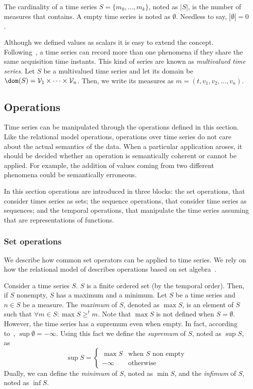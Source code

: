 The cardinality of a time series $S=\{m_0,\dots,m_k\}$, noted as
$|S|$, is the number of measures that contains.  A empty time series is
noted as $\emptyset$. Needless to say, $|\emptyset|=0$.

Although we defined values as scalars it is easy to extend the
concept. Following~\cite{assfalg08:thesis}, a time series can record
more than one phenomena if they share the same acquisition time
instants.  This kind of series are known as \emph{multivalued time
  series}. Let $S$ be a multivalued time series and let its domain be
$\dom(S)={\cal{V}}_1\times\cdots\times{\cal{V}}_n$. Then, we write its
measures as $m=(t,v_1,v_2,\ldots,v_n)$.





\subsection{Operations}
\label{sec:model:operations}

Time series can be manipulated through the operations defined in this
section.
%
Like the relational model operations, operations over time series do
not care about the actual semantics of the data. When a particular
application aroses, it should be decided whether an operation is
semantically coherent or cannot be applied. For example, the addition
of values coming from two different phenomena could be semantically
erroneous.

In this section operations are introduced in three blocks: the set
operations, that consider times series as sets; the sequence
operations, that consider time series as sequences; and the temporal
operations, that manipulate the time series assuming that are
representations of functions. 



\subsubsection{Set operations}

We describe how common set operators can be applied to time series. We
rely on how the relational model of  describes operations
based on set algebra~\cite{date:introduction}.

Consider a time series $S$. $S$ is a finite ordered set (by the
temporal order). Then, if $S$ nonempty, $S$ has a maximum and a
minimum.  
%
Let $S$ be a time series and $n\in S$ be a measure. The \emph{maximum}
of $S$, denoted as $\max S$, is an element of $S$ such that $\forall m
\in S:\max S\geq^t m $.  
%
Note that $\max S$ is not defined when $S=\emptyset$. However, the
time series has a supremum even when empty. In fact, according
to~\cite{cantrell:extendedreal}, $\sup \emptyset=-\infty$.
%
Using this fact we define the \emph{supremum} of $S$, noted as
$\sup S$, as
\[
\sup S =\begin{cases}
  \max S    & \text{when $S$ non empty}\\
  -\infty   & \text{otherwise}
\end{cases}
\]
Dually, we can define the \emph{minimum} of $S$, noted as $\min S$,
and the \emph{infimum} of $S$, noted as $\inf S$.

